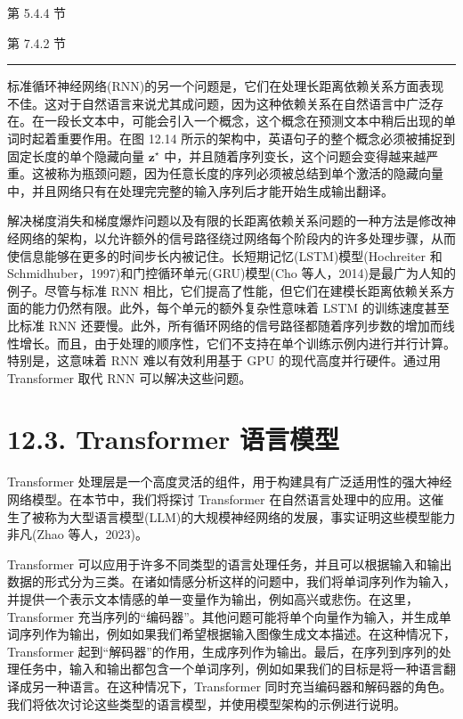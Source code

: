 \documentclass[10pt]{article}
\newcommand{\HRule}{\begin{center}\rule{0.9\linewidth}{0.2mm}\end{center}}
\begin{document}
第 5.4.4 节

第 7.4.2 节

\HRule

标准循环神经网络(RNN)的另一个问题是，它们在处理长距离依赖关系方面表现不佳。这对于自然语言来说尤其成问题，因为这种依赖关系在自然语言中广泛存在。在一段长文本中，可能会引入一个概念，这个概念在预测文本中稍后出现的单词时起着重要作用。在图 12.14 所示的架构中，英语句子的整个概念必须被捕捉到固定长度的单个隐藏向量 \({\mathbf{z}}^{ \star  }\) 中，并且随着序列变长，这个问题会变得越来越严重。这被称为瓶颈问题，因为任意长度的序列必须被总结到单个激活的隐藏向量中，并且网络只有在处理完完整的输入序列后才能开始生成输出翻译。

解决梯度消失和梯度爆炸问题以及有限的长距离依赖关系问题的一种方法是修改神经网络的架构，以允许额外的信号路径绕过网络每个阶段内的许多处理步骤，从而使信息能够在更多的时间步长内被记住。长短期记忆(LSTM)模型(Hochreiter 和 Schmidhuber，1997)和门控循环单元(GRU)模型(Cho 等人，2014)是最广为人知的例子。尽管与标准 RNN 相比，它们提高了性能，但它们在建模长距离依赖关系方面的能力仍然有限。此外，每个单元的额外复杂性意味着 LSTM 的训练速度甚至比标准 RNN 还要慢。此外，所有循环网络的信号路径都随着序列步数的增加而线性增长。而且，由于处理的顺序性，它们不支持在单个训练示例内进行并行计算。特别是，这意味着 RNN 难以有效利用基于 GPU 的现代高度并行硬件。通过用 Transformer 取代 RNN 可以解决这些问题。

\section*{12.3. Transformer 语言模型}

Transformer 处理层是一个高度灵活的组件，用于构建具有广泛适用性的强大神经网络模型。在本节中，我们将探讨 Transformer 在自然语言处理中的应用。这催生了被称为大型语言模型(LLM)的大规模神经网络的发展，事实证明这些模型能力非凡(Zhao 等人，2023)。

Transformer 可以应用于许多不同类型的语言处理任务，并且可以根据输入和输出数据的形式分为三类。在诸如情感分析这样的问题中，我们将单词序列作为输入，并提供一个表示文本情感的单一变量作为输出，例如高兴或悲伤。在这里，Transformer 充当序列的“编码器”。其他问题可能将单个向量作为输入，并生成单词序列作为输出，例如如果我们希望根据输入图像生成文本描述。在这种情况下，Transformer 起到“解码器”的作用，生成序列作为输出。最后，在序列到序列的处理任务中，输入和输出都包含一个单词序列，例如如果我们的目标是将一种语言翻译成另一种语言。在这种情况下，Transformer 同时充当编码器和解码器的角色。我们将依次讨论这些类型的语言模型，并使用模型架构的示例进行说明。
\end{document}
